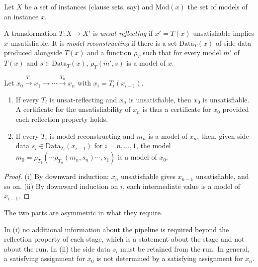 Let $X$ be a set of instances (clause sets, say) and $\mathrm{Mod}(x)$ the set of models of an instance $x$.

\begin{definition}
\label{def:reflecting}
A transformation $T:X\to X'$ is \emph{unsat-reflecting} if $x'=T(x)$ unsatisfiable implies $x$ unsatisfiable. It is \emph{model-reconstructing} if there is a set $\mathrm{Data}_T(x)$ of side data produced alongside $T(x)$ and a function $\rho_T$ such that for every model $m'$ of $T(x)$ and $s\in\mathrm{Data}_T(x)$, $\rho_T(m',s)$ is a model of $x$.
\end{definition}

\begin{theorem}
\label{thm:pipeline}
Let $x_0\xrightarrow{T_1}x_1\to\cdots\xrightarrow{T_n}x_n$ with $x_i=T_i(x_{i-1})$.
\begin{enumerate}[label=(\roman*),nosep]
\item If every $T_i$ is unsat-reflecting and $x_n$ is unsatisfiable, then $x_0$ is unsatisfiable. A certificate for the unsatisfiability of $x_n$ is thus a certificate for $x_0$ provided each reflection property holds.
\item If every $T_i$ is model-reconstructing and $m_n$ is a model of $x_n$, then, given side data $s_i\in\mathrm{Data}_{T_i}(x_{i-1})$ for $i=n,\dots,1$, the model $m_0=\rho_{T_1}(\cdots\rho_{T_n}(m_n,s_n)\cdots,s_1)$ is a model of $x_0$.
\end{enumerate}
\end{theorem}

\begin{proof}
(i) By downward induction: $x_n$ unsatisfiable gives $x_{n-1}$ unsatisfiable, and so on. (ii) By downward induction on $i$, each intermediate value is a model of $x_{i-1}$.
\end{proof}

The two parts are asymmetric in what they require.

\begin{proposition}
\label{prop:asymmetry}
In (i) no additional information about the pipeline is required beyond the reflection property of each stage, which is a statement about the stage and not about the run. In (ii) the side data $s_i$ must be retained from the run. In general, a satisfying assignment for $x_0$ is not determined by a satisfying assignment for $x_n$.
\end{proposition}

